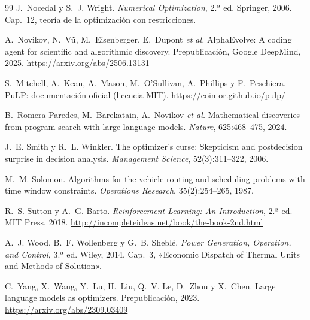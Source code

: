 \begin{thebibliography}{99}
J.~Nocedal y S.~J. Wright.
\newblock \emph{Numerical Optimization}, 2.ª ed.
\newblock Springer, 2006. Cap.~12, teoría de la optimización con restricciones.

A.~Novikov, N.~V{\~u}, M.~Eisenberger, E.~Dupont \emph{et al.}
\newblock AlphaEvolve: A coding agent for scientific and algorithmic discovery.
\newblock Prepublicación, Google DeepMind, 2025.
\newblock \url{https://arxiv.org/abs/2506.13131}

S.~Mitchell, A.~Kean, A.~Mason, M.~O'Sullivan, A.~Phillips y F.~Peschiera.
\newblock PuLP: documentación oficial (licencia MIT).
\newblock \url{https://coin-or.github.io/pulp/}

B.~Romera-Paredes, M.~Barekatain, A.~Novikov \emph{et al.}
\newblock Mathematical discoveries from program search with large language models.
\newblock \emph{Nature}, 625:468--475, 2024.

J.~E. Smith y R.~L. Winkler.
\newblock The optimizer's curse: Skepticism and postdecision surprise in decision analysis.
\newblock \emph{Management Science}, 52(3):311--322, 2006.

M.~M. Solomon.
\newblock Algorithms for the vehicle routing and scheduling problems with time window constraints.
\newblock \emph{Operations Research}, 35(2):254--265, 1987.

R.~S. Sutton y A.~G. Barto.
\newblock \emph{Reinforcement Learning: An Introduction}, 2.ª ed.
\newblock MIT Press, 2018.
\newblock \url{http://incompleteideas.net/book/the-book-2nd.html}

A.~J. Wood, B.~F. Wollenberg y G.~B. Sheblé.
\newblock \emph{Power Generation, Operation, and Control}, 3.ª ed.
\newblock Wiley, 2014. Cap.~3, «Economic Dispatch of Thermal Units and Methods of Solution».

C.~Yang, X.~Wang, Y.~Lu, H.~Liu, Q.~V. Le, D.~Zhou y X.~Chen.
\newblock Large language models as optimizers.
\newblock Prepublicación, 2023.
\newblock \url{https://arxiv.org/abs/2309.03409}

\end{thebibliography}
